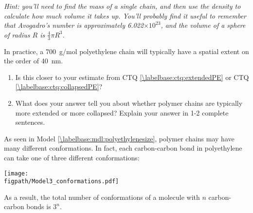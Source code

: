 \begin{activity}
\begin{ctqs}
		\emph{Hint: you'll need to find the mass of a single chain, and then use the density to calculate how much volume it takes up.  You'll probably find it useful to remember that Avogadro's number is approximately 6.022$\times 10^23$, and the volume of a sphere of radius $R$ is $\frac{4}{3}\pi R^3$.}
		
		\begin{solution}[3.75in]
		\end{solution}
		
	\question In practice, a 700~g/mol polyethylene chain will typically have a spatial extent on the order of 40~nm.  
	
		\begin{enumerate}
			\item Is this closer to your estimate from CTQ \ref{\labelbase:ctq:extendedPE} or CTQ \ref{\labelbase:ctq:collapsedPE}?
			
				\begin{solution}[0.5in]
				\end{solution}
			
			\item What does your answer tell you about whether polymer chains are typically more extended or more collapsed?  Explain your answer in 1-2 complete sentences.
			
				\begin{solution}[1.75in]
				\end{solution}
			
		\end{enumerate}
		
\end{ctqs}



\begin{model}
	\label{\labelbase:mdl:conformations}

	As seen in Model \ref{\labelbase:mdl:polyethylenesize}, polymer chains may have many different conformations.  In fact, each carbon-carbon bond in polyethylene can take one of three different conformations:
	
	\vspace{6pt}
	\centerline{\texttt{[image: \\figpath/Model3\_conformations.pdf]}}
	
	As a result, the total number of conformations of a molecule with $n$ carbon-carbon bonds is $3^n$.

\end{model}

\begin{ctqs}


\end{ctqs}
\end{activity}
